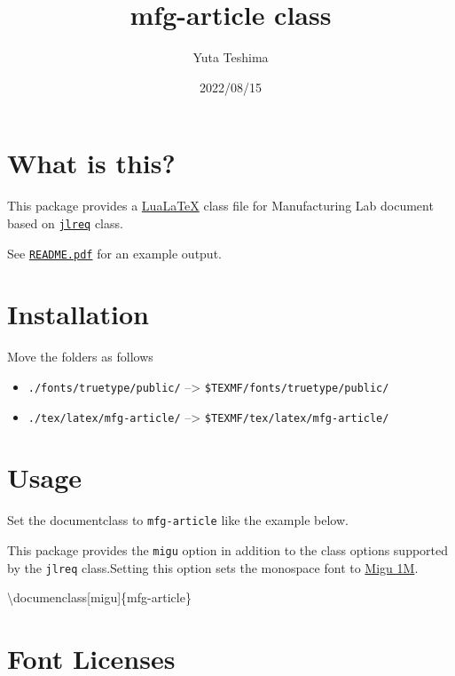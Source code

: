 \documentclass[
  pandoc]{mfg-article}
\title{mfg-article class}
\author{Yuta Teshima}
\date{2022/08/15}
\newenvironment{Shaded}{}{}
\newcommand{\FunctionTok}[1]{\textcolor[rgb]{0.02,0.16,0.49}{#1}}
\newcommand{\NormalTok}[1]{#1}
\providecommand{\tightlist}{%
  \setlength{\itemsep}{0pt}\setlength{\parskip}{0pt}}
\begin{document}
\maketitle

\hypertarget{what-is-this}{%
\section{What is this?}\label{what-is-this}}

This package provides a \href{https://www.luatex.org/}{LuaLaTeX} class
file for Manufacturing Lab document based on
\href{https://github.com/abenori/jlreq}{\texttt{jlreq}} class.

See \href{./README.pdf}{\texttt{README.pdf}} for an example output.

\hypertarget{installation}{%
\section{Installation}\label{installation}}

Move the folders as follows

\begin{itemize}
\tightlist
\item
  \texttt{./fonts/truetype/public/} --\textgreater{}
  \texttt{\$TEXMF/fonts/truetype/public/}
\item
  \texttt{./tex/latex/mfg-article/} --\textgreater{}
  \texttt{\$TEXMF/tex/latex/mfg-article/}
\end{itemize}

\hypertarget{usage}{%
\section{Usage}\label{usage}}

Set the documentclass to \texttt{mfg-article} like the example below.

This package provides the \texttt{migu} option in addition to the class
options supported by the \texttt{jlreq} class.Setting this option sets
the monospace font to \href{https://mix-mplus-ipa.osdn.jp/migu/}{Migu
1M}.

\begin{Shaded}
\begin{Highlighting}[]
\FunctionTok{\textbackslash{}documenclass}\NormalTok{[migu]\{mfg{-}article\}}
\end{Highlighting}
\end{Shaded}

\hypertarget{font-licenses}{%
\section{Font Licenses}\label{font-licenses}}
\end{document}
